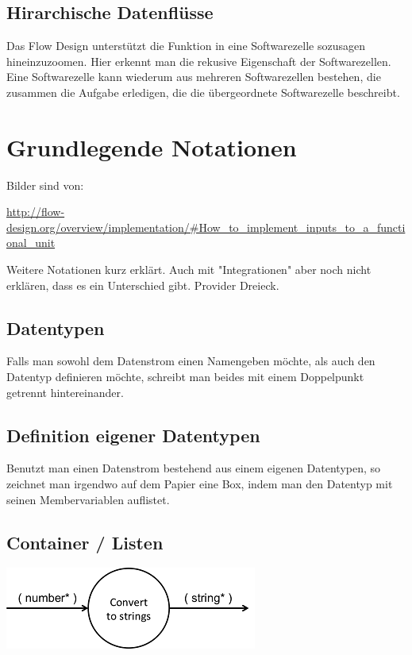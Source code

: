\documentclass[11pt]{article}
\begin{document}
\subsection{Hirarchische Datenflüsse}
\label{sec:orgheadline3}
Das Flow Design unterstützt die Funktion in eine Softwarezelle sozusagen hineinzuzoomen.
Hier erkennt man die rekusive Eigenschaft der Softwarezellen. Eine Softwarezelle kann wiederum aus mehreren Softwarezellen bestehen,
die zusammen die Aufgabe erledigen, die die übergeordnete Softwarezelle beschreibt.


\section{Grundlegende Notationen}
\label{sec:orgheadline18}
Bilder sind von: 

\url{http://flow-design.org/overview/implementation/#How_to_implement_inputs_to_a_functional_unit}

Weitere Notationen kurz erklärt. Auch mit "Integrationen" aber noch nicht erklären, dass es ein Unterschied gibt.
Provider Dreieck.
\subsection{Datentypen}
\label{sec:orgheadline5}

Falls man sowohl dem Datenstrom einen Namengeben möchte, als auch den Datentyp definieren möchte, schreibt man beides mit einem
Doppelpunkt getrennt hintereinander.
\subsection{Definition eigener Datentypen}
\label{sec:orgheadline6}
Benutzt man einen Datenstrom bestehend aus einem eigenen Datentypen, so zeichnet man irgendwo auf dem Papier eine Box,
indem man den Datentyp mit seinen Membervariablen auflistet.
\subsection{Container / Listen}
\label{sec:orgheadline7}

\includegraphics[width=.9\linewidth]{./img/diagramCollection.png}
\end{document}
